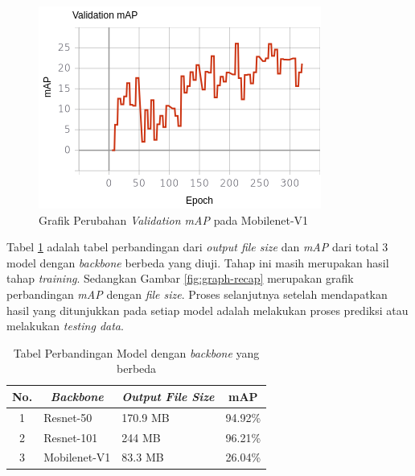 \begin{figure}[h]
	\centering
	\includegraphics[scale=0.4]{gambar/mobilenetv1-map.png}
	\caption{Grafik Perubahan \textit{Validation mAP} pada Mobilenet-V1}
	\label{fig:mobilenetv1-map}
\end{figure} 

Tabel \ref{tab:train-recap} adalah tabel perbandingan dari \textit{output file size} dan \textit{mAP} dari total 3 model dengan \textit{backbone} berbeda yang diuji. Tahap ini masih merupakan hasil tahap \textit{training}. Sedangkan Gambar \ref{fig:graph-recap} merupakan grafik perbandingan \textit{mAP} dengan \textit{file size}. Proses selanjutnya setelah mendapatkan hasil yang ditunjukkan pada setiap model adalah melakukan proses prediksi atau melakukan \textit{testing data}.

\begin{table}[h]
	\centering
	\caption{Tabel Perbandingan Model dengan \textit{backbone} yang berbeda}
	\begin{tabular}{|c|l|l|l|}
		\hline
		\textbf{No.} & \multicolumn{1}{c|}{\textit{\textbf{Backbone}}} & \multicolumn{1}{c|}{\textit{\textbf{Output File Size}}} & \multicolumn{1}{c|}{\textbf{mAP}} \\ \hline
		1            & Resnet-50                                       & 170.9 MB                                                & 94.92\%                           \\ \hline
		2            & Resnet-101                                      & 244 MB                                                  & 96.21\%                           \\ \hline
		3            & Mobilenet-V1                                    & 83.3 MB                                                 & 26.04\%                           \\ \hline
	\end{tabular}
	\label{tab:train-recap}
\end{table}


